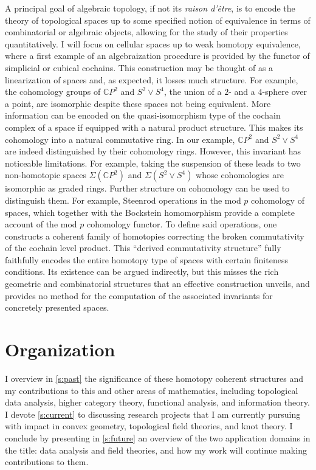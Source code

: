 A principal goal of algebraic topology, if not its \emph{raison d'\^{e}tre}, is to encode the theory of topological spaces up to some specified notion of equivalence in terms of combinatorial or algebraic objects, allowing for the study of their properties quantitatively.
I will focus on cellular spaces up to weak homotopy equivalence, where a first example of an algebraization procedure is provided by the functor of simplicial or cubical cochains.
This construction may be thought of as a linearization of spaces and, as expected, it losses much structure.
For example, the cohomology groups of $\mathbb{C} P^2$ and $S^2 \vee S^4$, the union of a $2$- and a $4$-sphere over a point, are isomorphic despite these spaces not being equivalent.
More information can be encoded on the quasi-isomorphism type of the cochain complex of a space if equipped with a natural product structure.
This makes its cohomology into a natural commutative ring.
In our example, $\mathbb{C} P^2$ and $S^2 \vee S^4$ are indeed distinguished by their cohomology rings.
However, this invariant has noticeable limitations.
For example, taking the suspension of these leads to two non-homotopic spaces $\Sigma(\mathbb{C} P^2)$ and $\Sigma(S^2 \vee S^4)$ whose cohomologies are isomorphic as graded rings.
Further structure on cohomology can be used to distinguish them.
For example, Steenrod operations in the mod $p$ cohomology of spaces, which together with the Bockstein homomorphism provide a complete account of the mod $p$ cohomology functor.
To define said operations, one constructs a coherent family of homotopies correcting the broken commutativity of the cochain level product.
This ``derived commutativity structure'' fully faithfully encodes the entire homotopy type of spaces with certain finiteness conditions.
Its existence can be argued indirectly, but this misses the rich geometric and combinatorial structures that an effective construction unveils, and provides no method for the computation of the associated invariants for concretely presented spaces.

\section*{Organization}

I overview in \cref{s:past} the significance of these homotopy coherent structures and my contributions to this and other areas of mathematics, including topological data analysis, higher category theory, functional analysis, and information theory.
I devote \cref{s:current} to discussing research projects that I am currently pursuing with impact in convex geometry, topological field theories, and knot theory.
I conclude by presenting in \cref{s:future} an overview of the two application domains in the title: data analysis and field theories, and how my work will continue making contributions to them.
